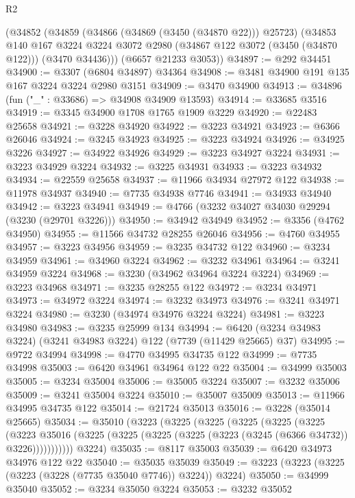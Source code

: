 \begin{lexlean}{R2}
\begin{coremodule}
    (@34852
      (@34859
        (@34866 (@34869 (@3450 (@34870 @22))) @25723)
        (@34853
          @140
          @167
          @3224
          @3224
          @3072
          @2980
          (@34867 @122 @3072 (@3450 (@34870 @122)))
          (@3470 @34436)))
      (@6657 @21233 @3053))
@34897 := @292 @34451
@34900 := @3307 (@6804 @34897) @34364
@34908 := @3481 @34900 @191 @135 @167 @3224 @3224 @2980 @3151
@34909 := @3470 @34900
@34913 := @34896 (fun ("_" : @33686) => @34908 @34909 @13593)
@34914 := @33685 @3516
@34919 := @3345 @34900 @1708 @1765 @1909 @3229
@34920 := @22483 @25658
@34921 := @3228 @34920
@34922 := @3223 @34921
@34923 := @6366 @26046
@34924 := @3245 @34923
@34925 := @3223 @34924
@34926 := @34925 @3226
@34927 := @34922 @34926
@34929 := @3223 @34927 @3224
@34931 := @3223 @34929 @3224
@34932 := @3225 @34931
@34933 := @3223 @34932
@34934 := @22559 @25658
@34937 := @11966 @34934 @27972 @122
@34938 := @11978 @34937
@34940 := @7735 @34938 @7746
@34941 := @34933 @34940
@34942 := @3223 @34941
@34949 := @4766 (@3232 @34027 @34030 @29294 (@3230 (@29701 @3226)))
@34950 := @34942 @34949
@34952 := @3356 (@4762 @34950)
@34955 := @11566 @34732 @28255 @26046
@34956 := @4760 @34955
@34957 := @3223 @34956
@34959 := @3235 @34732 @122
@34960 := @3234 @34959
@34961 := @34960 @3224
@34962 := @3232 @34961
@34964 := @3241 @34959 @3224
@34968 := @3230 (@34962 @34964 @3224 @3224)
@34969 := @3223 @34968
@34971 := @3235 @28255 @122
@34972 := @3234 @34971
@34973 := @34972 @3224
@34974 := @3232 @34973
@34976 := @3241 @34971 @3224
@34980 := @3230 (@34974 @34976 @3224 @3224)
@34981 := @3223 @34980
@34983 := @3235 @25999 @134
@34994 := @6420 (@3234 @34983 @3224) (@3241 @34983 @3224) @122 (@7739 (@11429 @25665) @37)
@34995 := @9722 @34994
@34998 := @4770 @34995 @34735 @122
@34999 := @7735 @34998
@35003 := @6420 @34961 @34964 @122 @22
@35004 := @34999 @35003
@35005 := @3234 @35004
@35006 := @35005 @3224
@35007 := @3232 @35006
@35009 := @3241 @35004 @3224
@35010 := @35007 @35009
@35013 := @11966 @34995 @34735 @122
@35014 := @21724 @35013
@35016 := @3228 (@35014 @25665)
@35034 := @35010
    (@3223
      (@3225
        (@3225
          (@3225
            (@3225
              (@3225
                (@3223
                  @35016
                  (@3225 (@3225 (@3225 (@3225 (@3223 (@3245 (@6366 @34732)) @3226)))))))))))
      @3224)
@35035 := @8117 @35003
@35039 := @6420 @34973 @34976 @122 @22
@35040 := @35035 @35039
@35049 := @3223 (@3223 (@3225 (@3223 (@3228 (@7735 @35040 @7746)) @3224)) @3224)
@35050 := @34999 @35040
@35052 := @3234 @35050 @3224
@35053 := @3232 @35052

\end{coremodule}
\end{lexlean}
